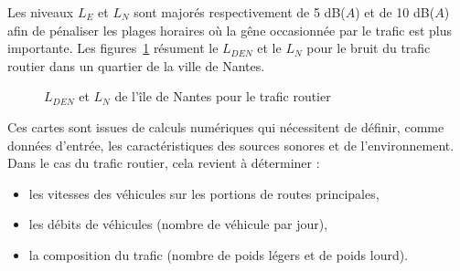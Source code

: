 Les niveaux $L_E$ et $L_N$ sont majorés respectivement de 5 dB($A$) et de 10 dB($A$) afin de pénaliser les plages horaires où la gêne occasionnée par le trafic est plus importante. Les figures~\ref{fig:carto_nantes} résument le $L_{DEN}$ et le $L_N$ pour le bruit du trafic routier dans un quartier de la ville de Nantes.

\begin{figure}[t]
\centering
{}
\caption{$L_{DEN}$  et $L_N$  de l'île de Nantes pour le trafic routier \cite{nantes_carte}}
\label{fig:carto_nantes}
\end{figure}

Ces cartes sont issues de calculs numériques qui nécessitent de définir, comme données d'entrée, les caractéristiques des sources sonores et de l'environnement.  Dans le cas du trafic routier, cela revient à déterminer : 

\begin{itemize}
\item les vitesses des véhicules sur les portions de routes principales, 
\item les débits de véhicules (nombre de véhicule par jour), \item la composition du trafic (nombre de poids légers et de poids lourd).\\
\end{itemize}

